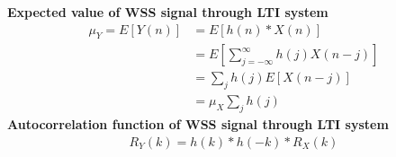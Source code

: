 \documentclass[12pt,a4paper]{report}
\author{Frederik Appel Vardinghus-Nielsen}
\begin{document}
\noindent\textbf{Expected value of WSS signal through LTI system}
\begin{align*}
\mu_Y=E[Y(n)]&=E[h(n)*X(n)]\\
&=E\left[\sum_{j=-\infty}^{\infty}h(j)X(n-j)\right]\\
&=\sum_jh(j)E[X(n-j)]\\
&=\mu_X\sum_jh(j)
\end{align*}
\textbf{Autocorrelation function of WSS signal through LTI system}
\begin{align*}
R_Y(k)=h(k)*h(-k)*R_X(k)
\end{align*}
\end{document}
